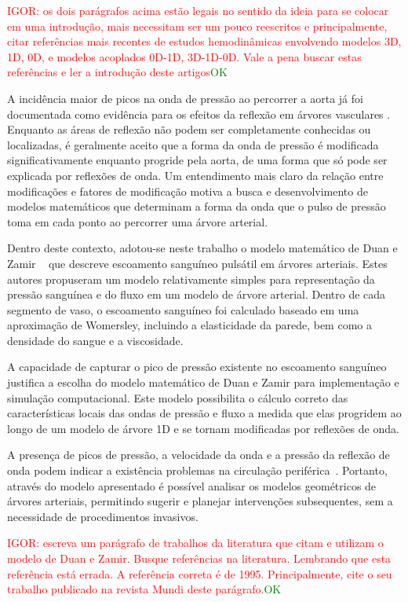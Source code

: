\documentclass[a4paper,12pt]{monografia}
\theoremstyle{plain}
\theoremstyle{definition}
\theoremstyle{remark}
\begin{document}
\textcolor{red}{IGOR: os dois parágrafos acima estão legais no sentido da ideia para se colocar em uma introdução, mais necessitam ser um pouco reescritos e principalmente, citar referências mais recentes de estudos hemodinâmicas envolvendo modelos 3D, 1D, 0D, e modelos acoplados 0D-1D, 3D-1D-0D. Vale a pena buscar estas referências e ler a introdução deste artigos}\textcolor{green}{OK}

A incidência maior de picos na onda de pressão ao percorrer a aorta já foi documentada como evidência para os efeitos da reflexão em árvores vasculares \cite{Kouchoukos,Lighthill,McDonald}. Enquanto as áreas de reflexão não podem ser completamente conhecidas ou localizadas, é geralmente aceito que a forma da onda de pressão é modificada significativamente enquanto progride pela aorta, de uma forma que só pode ser explicada por reflexões de onda.  Um entendimento mais claro da relação entre modificações e fatores de modificação motiva a busca e desenvolvimento de modelos matemáticos que determinam a forma da onda que o pulso de pressão toma em cada ponto ao percorrer uma árvore arterial. 

Dentro deste contexto, adotou-se neste trabalho o modelo matemático de Duan e Zamir ~\cite{Duan} que descreve escoamento sanguíneo pulsátil em árvores arteriais. Estes autores propuseram um modelo relativamente simples para representação da pressão sanguínea e do fluxo em um modelo de árvore arterial. Dentro de cada segmento de vaso, o escoamento sanguíneo foi calculado baseado em uma aproximação de Womersley, incluindo a elasticidade da parede, bem como a densidade do sangue e a viscosidade.

A capacidade de capturar o pico de pressão existente no escoamento sanguíneo justifica a escolha do modelo matemático de Duan e Zamir para implementação e simulação computacional. Este modelo possibilita o cálculo correto das características locais das ondas de pressão e fluxo a medida que elas progridem ao longo de um modelo de árvore 1D e se tornam modificadas por reflexões de onda.

A presença de picos de pressão, a velocidade da onda e a pressão da reflexão de onda podem indicar a existência problemas na circulação periférica~\cite{TAKAHASHI202129}. Portanto, através do modelo apresentado é possível analisar os modelos geométricos de árvores arteriais, permitindo sugerir e planejar intervenções subsequentes, sem a necessidade de procedimentos invasivos.

\textcolor{red}{IGOR: escreva um parágrafo de trabalhos da literatura que citam e utilizam o modelo de Duan e Zamir. Busque referências na literatura. Lembrando que esta referência \cite{Duan} está errada. A referência correta é de 1995. Principalmente, cite o seu trabalho publicado na revista Mundi deste parágrafo.}\textcolor{green}{OK}
\end{document}
